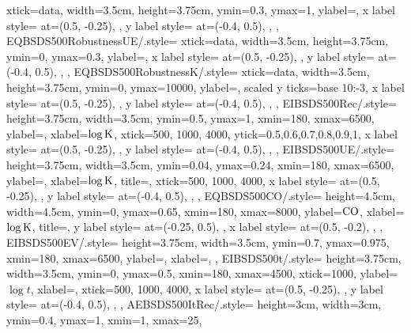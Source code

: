 {{    	xtick=data,
		width=3.5cm,
		height=3.75cm,
		ymin=0.3,
		ymax=1,
        ylabel=\Rec,
        x label style={
    		at={(0.5, -0.25)},
        },
        y label style={
            at={(-0.4, 0.5)},
        },
    },
    EQBSDS500RobustnessUE/.style={
    	xtick=data,
		width=3.5cm,
		height=3.75cm,
		ymin=0,
		ymax=0.3,
        ylabel=\UE,
        x label style={
    		at={(0.5, -0.25)},
        },
        y label style={
            at={(-0.4, 0.5)},
        },
    },
    EQBSDS500RobustnessK/.style={
    	xtick=data,
		width=3.5cm,
		height=3.75cm,
		ymin=0,
		ymax=10000,
        ylabel=\K,
        scaled y ticks={base 10:-3},
        x label style={
    		at={(0.5, -0.25)},
        },
        y label style={
            at={(-0.4, 0.5)},
        },
    },
    EIBSDS500Rec/.style={
        height=3.75cm,
        width=3.5cm,
        ymin=0.5,
        ymax=1,
        xmin=180,
        xmax=6500,
        ylabel=\Rec,
        xlabel=$\log\text{K}$,
        xtick={500, 1000, 4000},
        ytick={0.5,0.6,0.7,0.8,0.9,1},
        x label style={
    		at={(0.5, -0.25)},
        },
        y label style={
            at={(-0.4, 0.5)},
        },
    },
    EIBSDS500UE/.style={
        height=3.75cm,
        width=3.5cm,
        ymin=0.04,
        ymax=0.24,
        xmin=180,
        xmax=6500,
        ylabel=\UE,
        xlabel=$\log\text{K}$,
        title=\BSDS,
        xtick={500, 1000, 4000},
        x label style={
    		at={(0.5, -0.25)},
        },
        y label style={
            at={(-0.4, 0.5)},
        },
    },
    EQBSDS500CO/.style={
        height=4.5cm,
        width=4.5cm,
        ymin=0,
        ymax=0.65,
        xmin=180,
        xmax=8000,
        ylabel=$\text{CO}$,
        xlabel=$\log\text{K}$,
        title=\BSDS,
        y label style={
    		at={(-0.25, 0.5)},
        },
        x label style={
    		at={(0.5, -0.2)},
        },
    },
    EIBSDS500EV/.style={
        height=3.75cm,
        width=3.5cm,
        ymin=0.7,
        ymax=0.975,
        xmin=180,
        xmax=6500,
        ylabel=\EV,
        xlabel=\K,
    },
    EIBSDS500t/.style={
    	height=3.75cm,
        width=3.5cm,
        ymin=0,
        ymax=0.5,
        xmin=180,
        xmax=4500,
        xtick={1000},
        ylabel=$\log t$,
        xlabel=\K,
        xtick={500, 1000, 4000},
        x label style={
    		at={(0.5, -0.25)},
        },
        y label style={
            at={(-0.4, 0.5)},
        },
    },
    AEBSDS500ItRec/.style={
    	height=3cm,
        width=3cm,
        ymin=0.4,
        ymax=1,
        xmin=1,
        xmax=25,
}}
